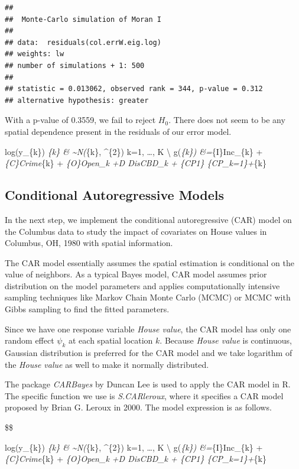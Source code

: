 \documentclass[
]{article}
\begin{document}
\begin{verbatim}
## 
##  Monte-Carlo simulation of Moran I
## 
## data:  residuals(col.errW.eig.log) 
## weights: lw  
## number of simulations + 1: 500 
## 
## statistic = 0.013062, observed rank = 344, p-value = 0.312
## alternative hypothesis: greater
\end{verbatim}

With a p-value of 0.3559, we fail to reject \(H_0\). There does not seem
to be any spatial dependence present in the residuals of our error
model.

log(y\_\{k\}) \mid \mu\emph{\{k\} \& \sim N\left(\mu}\{k\},
\nu\^{}\{2\}\right) \quad {} k=1, \ldots, K \textbackslash{}
g\left(\mu\emph{\{k\}\right) \&=\beta}\{I\}Inc\_\{k\} +
\beta\emph{\{C\}Crime}\{k\} + \beta\emph{\{O\}Open\_k +\beta\emph{D
DisCBD\_k + \beta}\{CP1\} \{CP\_k=1\}+\psi}\{k\}

\hypertarget{conditional-autoregressive-models}{%
\subsection{Conditional Autoregressive
Models}\label{conditional-autoregressive-models}}

In the next step, we implement the conditional autoregressive (CAR)
model on the Columbus data to study the impact of covariates on House
values in Columbus, OH, 1980 with spatial information.

The CAR model essentially assumes the spatial estimation is conditional
on the value of neighbors. As a typical Bayes model, CAR model assumes
prior distribution on the model parameters and applies computationally
intensive sampling techniques like Markov Chain Monte Carlo (MCMC) or
MCMC with Gibbs sampling to find the fitted parameters.

Since we have one response variable \emph{House value}, the CAR model
has only one random effect \(\psi_k\) at each spatial location \(k\).
Because \emph{House value} is continuous, Gaussian distribution is
preferred for the CAR model and we take logarithm of the \emph{House
value} as well to make it normally distributed.

The package \emph{CARBayes} by Duncan Lee is used to apply the CAR model
in R. The specific function we use is \emph{S.CARleroux}, where it
specifies a CAR model proposed by Brian G. Leroux in 2000. The model
expression is as follows.

\$\$

log(y\_\{k\}) \mid \mu\emph{\{k\} \& \sim N\left(\mu}\{k\},
\nu\^{}\{2\}\right) \quad {} k=1, \ldots, K \textbackslash{}
g\left(\mu\emph{\{k\}\right) \&=\beta}\{I\}Inc\_\{k\} +
\beta\emph{\{C\}Crime}\{k\} + \beta\emph{\{O\}Open\_k +\beta\emph{D
DisCBD\_k + \beta}\{CP1\} \{CP\_k=1\}+\psi}\{k\}
\end{document}
